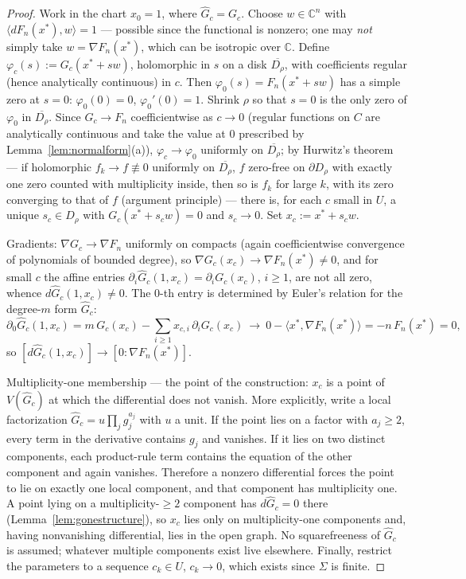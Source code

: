 \documentclass[acmsmall,screen,nonacm]{acmart}
\theoremstyle{definition}
\theoremstyle{remark}
\newcommand{\CC}{\mathbb{C}}
\begin{document}
\begin{proof}
Work in the chart $x_0=1$, where $\widehat G_c=G_c$.  Choose
$w\in\CC^n$ with $\langle dF_n(x^*),w\rangle=1$ --- possible since the
functional is nonzero; one may \emph{not} simply take
$w=\nabla F_n(x^*)$, which can be isotropic over $\CC$.  Define
$\varphi_c(s):=G_c(x^*+sw)$, holomorphic in $s$ on a disk
$\overline{D_\rho}$, with coefficients regular (hence analytically
continuous) in $c$.  Then $\varphi_0(s)=F_n(x^*+sw)$ has a simple zero
at $s=0$: $\varphi_0(0)=0$, $\varphi_0'(0)=1$.  Shrink $\rho$ so that
$s=0$ is the only zero of $\varphi_0$ in $\overline{D_\rho}$.  Since
$G_c\to F_n$ coefficientwise as $c\to0$ (regular functions on $C$ are
analytically continuous and take the value at $0$ prescribed by
Lemma~\ref{lem:normalform}(a)), $\varphi_c\to\varphi_0$ uniformly on
$\overline{D_\rho}$; by Hurwitz's theorem --- if holomorphic
$f_k\to f\not\equiv0$ uniformly on $\overline{D_\rho}$, $f$ zero-free
on $\partial D_\rho$ with exactly one zero counted with multiplicity
inside, then so is $f_k$ for large $k$, with its zero converging to
that of $f$ (argument principle) --- there is, for each $c$ small in
$U$, a unique $s_c\in D_\rho$ with $G_c(x^*+s_cw)=0$ and $s_c\to0$.
Set $x_c:=x^*+s_cw$.

Gradients: $\nabla G_c\to\nabla F_n$ uniformly on compacts (again
coefficientwise convergence of polynomials of bounded degree), so
$\nabla G_c(x_c)\to\nabla F_n(x^*)\ne0$, and for small $c$ the affine
entries $\partial_i\widehat G_c(1,x_c)=\partial_iG_c(x_c)$, $i\ge1$,
are not all zero, whence $d\widehat G_c(1,x_c)\ne0$.  The
$0$-th entry is determined by Euler's relation for the degree-$m$ form
$\widehat G_c$:
\[
  \partial_0\widehat G_c(1,x_c)
  =m\,G_c(x_c)-\sum_{i\ge1}x_{c,i}\,\partial_iG_c(x_c)
  \ \longrightarrow\
  0-\langle x^*,\nabla F_n(x^*)\rangle=-n\,F_n(x^*)=0 ,
\]
so $[d\widehat G_c(1,x_c)]\to[0:\nabla F_n(x^*)]$.

Multiplicity-one membership --- the point of the construction: $x_c$
is a point of $V(\widehat G_c)$ at which the differential does not
vanish.  More explicitly, write a local factorization
$\widehat G_c=u\prod_j g_j^{a_j}$ with $u$ a unit.  If the point lies on a
factor with $a_j\ge2$, every term in the derivative contains $g_j$ and
vanishes.  If it lies on two distinct components, each product-rule term
contains the equation of the other component and again vanishes.  Therefore a
nonzero differential forces the point to lie on exactly one local component,
and that component has multiplicity one.  A point lying on a
multiplicity-$\ge2$ component has
$d\widehat G_c=0$ there (Lemma~\ref{lem:gonestructure}), so $x_c$ lies
only on multiplicity-one components and, having nonvanishing
differential, lies in the open graph.  No squarefreeness of
$\widehat G_c$ is assumed; whatever multiple components exist live
elsewhere.  Finally, restrict the parameters to a sequence
$c_k\in U$, $c_k\to0$, which exists since $\Sigma$ is finite.
\end{proof}
\end{document}
